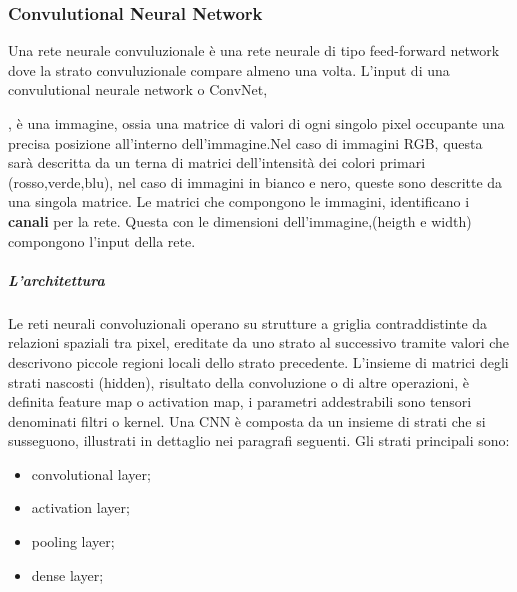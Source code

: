 \documentclass[14pt]{extarticle}
\begin{document}
\begin{itemize}
\subsubsection{Convulutional Neural Network}
Una rete neurale convuluzionale è una rete neurale di tipo feed-forward network dove la strato convuluzionale compare almeno una volta.
L'input di una convulutional neurale network o ConvNet, , è una immagine, ossia una matrice di valori di ogni singolo pixel occupante una precisa posizione all'interno dell'immagine.Nel caso di immagini RGB, questa sarà descritta da un terna di matrici dell'intensità dei colori primari (rosso,verde,blu), nel caso di immagini in bianco e nero, queste sono descritte da una singola matrice. Le matrici che compongono le immagini, identificano i \textbf{canali} per la rete. Questa con le dimensioni dell'immagine,(heigth e width) compongono l'input della rete.
\subparagraph{L'architettura} 
Le reti neurali convoluzionali operano su strutture a griglia contraddistinte da relazioni spaziali tra pixel, ereditate da uno strato al successivo tramite valori che descrivono
piccole regioni locali dello strato precedente. L’insieme di matrici degli strati nascosti (hidden), risultato della convoluzione o di altre operazioni, è definita feature map o
activation map, i parametri addestrabili sono tensori denominati filtri o kernel.
Una CNN è composta da  un insieme di strati che si susseguono, illustrati in dettaglio nei paragrafi seguenti. Gli strati principali sono:
\begin{itemize}
\item convolutional layer;
\item activation layer;
\item pooling layer;
\item dense layer;
\end{itemize}
\cite{torresin2019sviluppo}


\end{itemize}
\end{document}
